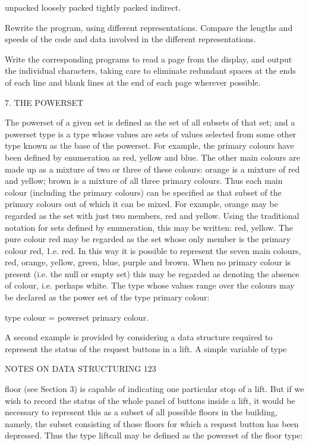 {{{			unpacked loosely packed tightly packed indirect.
			
			Rewrite the program, using different representations. Compare the lengths and speeds of the code and data involved in the different representations.
			
			Write the corresponding programs to read a page from the display, and output the individual characters, taking care to eliminate redundant spaces at the ends of each line and blank lines at the end of each page wherever possible.
			
			7. THE POWERSET
			
			The powerset of a given set is defined as the set of all subsets of that set; and a powerset type is a type whose values are sets of values selected from some other type known as the base of the powerset. For example, the primary colours have been defined by enumeration as red, yellow and blue. The other main colours are made up as a mixture of two or three of these colours: orange is a mixture of red and yellow; brown is a mixture of all three primary colours. Thus each main colour (including the primary colours) can be specified as that subset of the primary colours out of which it can be mixed. For example, orange may be regarded as the set with just two members, red and yellow. Using the traditional notation for sets defined by enumeration, this may be written: {red, yellow}. The pure colour red may be regarded as the set whose only member is the primary colour red, 1.e. {red}. In this way it is possible to represent the seven main colours, red, orange, yellow, green, blue, purple and brown. When no primary colour is present (i.e. the null or empty set) this may be regarded as denoting the absence of colour, i.e. perhaps white. The type whose values range over the colours may be declared as the power set of the type primary colour:
			
			type colour = powerset primary colour.
			
			A second example is provided by considering a data structure required to represent the status of the request buttons in a lift. A simple variable of type
			
			NOTES ON DATA STRUCTURING 123
			
			floor (see Section 3) is capable of indicating one particular stop of a lift. But if we wish to record the status of the whole panel of buttons inside a lift, it would be necessary to represent this as a subset of all possible floors in the building, namely, the subset consisting of those floors for which a request button has been depressed. Thus the type liftcall may be defined as the powerset of the floor type:
			
}}}
